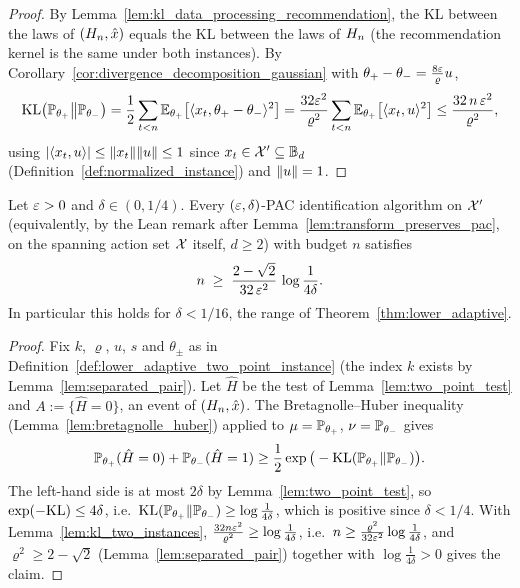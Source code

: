 \begin{proof}
\leanok
{}
By Lemma~\ref{lem:kl_data_processing_recommendation}, the KL between the laws of
$(H_n,\hat{x})$ equals the KL between the laws of $H_n$ (the recommendation kernel is
the same under both instances). By Corollary~\ref{cor:divergence_decomposition_gaussian} with
$\theta_+ - \theta_- = \frac{8\varepsilon}{\varrho}u$,
\[
  \mathrm{KL}\big(\mathbb{P}_{\theta_+}\big\|\mathbb{P}_{\theta_-}\big)
  = \frac12\sum_{t<n}\mathbb{E}_{\theta_+}\big[\langle x_t, \theta_+ - \theta_- \rangle^2\big]
  = \frac{32\varepsilon^2}{\varrho^2}\sum_{t<n}\mathbb{E}_{\theta_+}\big[\langle x_t, u \rangle^2\big]
  \le \frac{32\, n\,\varepsilon^2}{\varrho^2},
\]
using $\lvert \langle x_t, u \rangle \rvert \le \lVert x_t \rVert\lVert u \rVert \le 1$ since $x_t \in \mathcal{X}' \subseteq \mathbb{B}_d$
(Definition~\ref{def:normalized_instance}) and $\lVert u \rVert = 1$.
\end{proof}

\begin{lemma}\label{lem:baseline_lower}
\leanok
{}
Let $\varepsilon > 0$ and $\delta \in (0, 1/4)$. Every $(\varepsilon,\delta)$-PAC identification algorithm
on $\mathcal{X}'$ (equivalently, by the Lean remark after Lemma~\ref{lem:transform_preserves_pac}, on the
spanning action set $\mathcal{X}$ itself, $d \ge 2$) with budget $n$ satisfies
\[
  n \;\ge\; \frac{2 - \sqrt2}{32\,\varepsilon^2}\,\log\frac{1}{4\delta} .
\]
In particular this holds for $\delta < 1/16$, the range of Theorem~\ref{thm:lower_adaptive}.
\end{lemma}

\begin{proof}
\leanok
{}
Fix $k$, $\varrho$, $u$, $s$ and $\theta_\pm$ as in
Definition~\ref{def:lower_adaptive_two_point_instance} (the index $k$ exists by
Lemma~\ref{lem:separated_pair}). Let $\hat H$ be the test of Lemma~\ref{lem:two_point_test} and $A := \{\hat H = 0\}$, an
event of $(H_n,\hat{x})$. The Bretagnolle--Huber inequality (Lemma~\ref{lem:bretagnolle_huber})
applied to $\mu = \mathbb{P}_{\theta_+}$, $\nu = \mathbb{P}_{\theta_-}$ gives
\[
  \mathbb{P}_{\theta_+}(\hat H = 0) + \mathbb{P}_{\theta_-}(\hat H = 1)
  \ge \frac12\exp\big(-\mathrm{KL}(\mathbb{P}_{\theta_+}\|\mathbb{P}_{\theta_-})\big).
\]
The left-hand side is at most $2\delta$ by Lemma~\ref{lem:two_point_test}, so
$\exp(-\mathrm{KL}) \le 4\delta$, i.e.\ $\mathrm{KL}(\mathbb{P}_{\theta_+}\|\mathbb{P}_{\theta_-}) \ge \log\frac{1}{4\delta}$,
which is positive since $\delta < 1/4$. With Lemma~\ref{lem:kl_two_instances},
$\frac{32n\varepsilon^2}{\varrho^2} \ge \log\frac{1}{4\delta}$, i.e.\
$n \ge \frac{\varrho^2}{32\varepsilon^2}\log\frac1{4\delta}$, and $\varrho^2 \ge 2 - \sqrt2$
(Lemma~\ref{lem:separated_pair}) together with $\log\frac{1}{4\delta} > 0$ gives the claim.
\end{proof}

